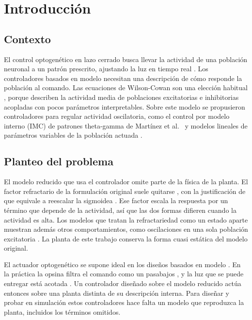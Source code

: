 \documentclass[11pt,a4paper]{article}
\begin{document}
\tableofcontents
\newpage

\section{Introducción}

\subsection{Contexto}

El control optogenético en lazo cerrado busca llevar la actividad de una población neuronal a un patrón prescrito, ajustando la luz en tiempo real \cite{grosenick2015,newman2015,zaaimi2023}. Los controladores basados en modelo necesitan una descripción de cómo responde la población al comando. Las ecuaciones de Wilson-Cowan son una elección habitual \cite{wilson1972,chow2020}, porque describen la actividad media de poblaciones excitatorias e inhibitorias acopladas con pocos parámetros interpretables. Sobre este modelo se propusieron controladores para regular actividad oscilatoria, como el control por modelo interno (IMC) de patrones theta-gamma de Martínez et al.\ \cite{martinez2022ifac} y modelos lineales de parámetros variables de la población actuada \cite{martinez2024lpv}.

\subsection{Planteo del problema}

El modelo reducido que usa el controlador omite parte de la física de la planta. El factor refractario de la formulación original suele quitarse \cite{kilpatrick2013,chow2020,martinez2022ifac}, con la justificación de que equivale a reescalar la sigmoidea \cite{kilpatrick2013}. Ese factor escala la respuesta por un término que depende de la actividad, así que las dos formas difieren cuando la actividad es alta. Los modelos que tratan la refractariedad como un estado aparte muestran además otros comportamientos, como oscilaciones en una sola población excitatoria \cite{painchaud2022,weistuch2020}. La planta de este trabajo conserva la forma cuasi estática del modelo original.

El actuador optogenético se supone ideal en los diseños basados en modelo \cite{martinez2022ifac}. En la práctica la opsina filtra el comando como un pasabajos \cite{williams2013,tchumatchenko2013}, y la luz que se puede entregar está acotada \cite{newman2015}. Un controlador diseñado sobre el modelo reducido actúa entonces sobre una planta distinta de su descripción interna. Para diseñar y probar en simulación estos controladores hace falta un modelo que reproduzca la planta, incluidos los términos omitidos.
\end{document}
